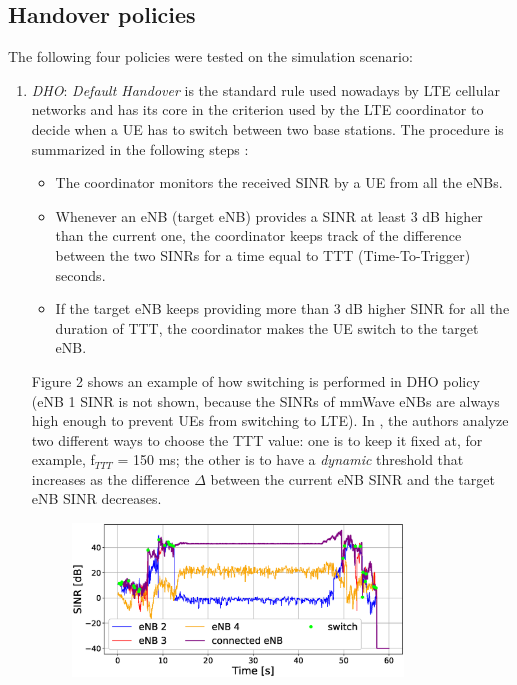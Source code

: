 \documentclass[conference,10pt]{IEEEtran}
\begin{document}
\noindent
\subsection{Handover policies}
The following four policies were tested on the simulation scenario:

\begin{enumerate}
\item \emph{DHO}: \emph{Default Handover} is the standard rule used nowadays by LTE cellular networks and has its core in the criterion used by the LTE coordinator to decide when a UE has to switch between two base stations. The procedure is summarized in the following steps \cite{imphand}:

\begin{itemize}
	\item The coordinator monitors the received SINR by a UE from all the eNBs.
	\item Whenever an eNB (target eNB) provides a SINR at least 3 dB higher than the current one, the coordinator keeps track of the difference between the two SINRs for a time equal to TTT (Time-To-Trigger) seconds.
	\item If the target eNB keeps providing more than 3 dB higher SINR for all the duration of TTT, the coordinator makes the UE switch to the target eNB.
\end{itemize}
Figure 2 shows an example of how switching is performed in DHO policy (eNB 1 SINR is not shown, because the SINRs of mmWave eNBs are always high enough to prevent UEs from switching to LTE). In \cite{imphand}, the authors analyze two different ways to choose the TTT value: one is to keep it fixed at, for example, f$_{TTT}$ = 150 ms; the other is to have a \emph{dynamic} threshold that increases as the difference $\Delta$ between the current eNB SINR and the target eNB SINR decreases.

\begin{figure}[!t]
	\vspace*{-7.0pt}
	\begin{center}    
		\includegraphics[width=8.8cm, keepaspectratio]{images/ue4_switch_dho.eps}
		\vspace*{-0pt}
	\end{center}
	

\end{figure}
\end{enumerate}
\end{document}

